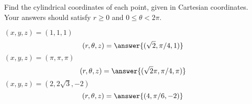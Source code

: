 \begin{problem}
Find the cylindrical coordinates of each point, given in Cartesian coordinates. Your answers should satisfy $r\geq 0$ and $0\leq \theta < 2\pi$.

$(x,y,z) = (1,1,1)$
\[
(r,\theta,z) = \answer{(\sqrt{2}, \pi/4, 1)}
\]
$(x,y,z) = (\pi,\pi,\pi)$
\[
(r,\theta,z) = \answer{(\sqrt{2}\pi, \pi/4, \pi)}
\]
$(x,y,z) = (2,2\sqrt{3},-2)$
\[
(r,\theta,z) = \answer{(4, \pi/6, -2)}
\]
\end{problem}